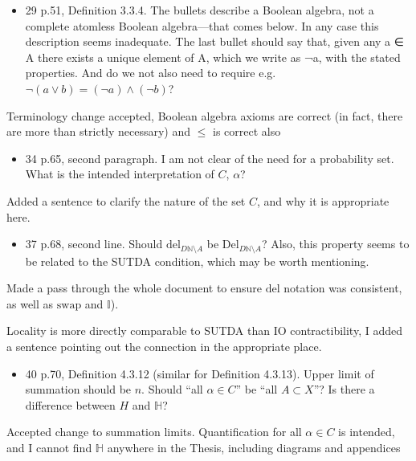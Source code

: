 \documentclass[12pt, a4paper]{article}
\begin{document}
\begin{itemize}
    \item 29 p.51, Definition 3.3.4. The bullets describe a Boolean algebra, not a complete atomless Boolean algebra—that comes below. In any case this description seems inadequate. The last bullet should say that, given any a ∈ A there exists a unique element of A, which we write as ¬a, with the stated properties. And do we not also need to require e.g. $\lnot (a \lor b) = (\lnot a) \land (\lnot b)$?
\end{itemize}

Terminology change accepted, Boolean algebra axioms are correct (in fact, there are more than strictly necessary) and $\leq$ is correct also

\begin{itemize}
    \item 34 p.65, second paragraph. I am not clear of the need for a probability set. What is the intended interpretation of $C$, $\alpha$?
\end{itemize}

Added a sentence to clarify the nature of the set $C$, and why it is appropriate here.

\begin{itemize}
    \item 37 p.68, second line. Should $\mathrm{del}_{D \mathbb{N}\setminus A}$ be $\mathrm{Del}_{D \mathbb{N}\setminus A}$? Also, this property seems to be related to the SUTDA condition, which may be worth mentioning.
\end{itemize}

Made a pass through the whole document to ensure $\mathrm{del}$ notation was consistent, as well as $\mathrm{swap}$ and $\mathbb{I}$). 

Locality is more directly comparable to SUTDA than IO contractibility, I added a sentence pointing out the connection in the appropriate place.

\begin{itemize}
    \item  40 p.70, Definition 4.3.12 (similar for Definition 4.3.13). Upper limit of summation should be $n$. Should ``all $\alpha\in C$'' be ``all $A \subset X$''? Is there a difference between $H$ and $\mathbb{H}$?
\end{itemize}


Accepted change to summation limits. Quantification for all $\alpha \in C$ is intended, and I cannot find $\mathbb{H}$ anywhere in the Thesis, including diagrams and appendices
\end{document}
